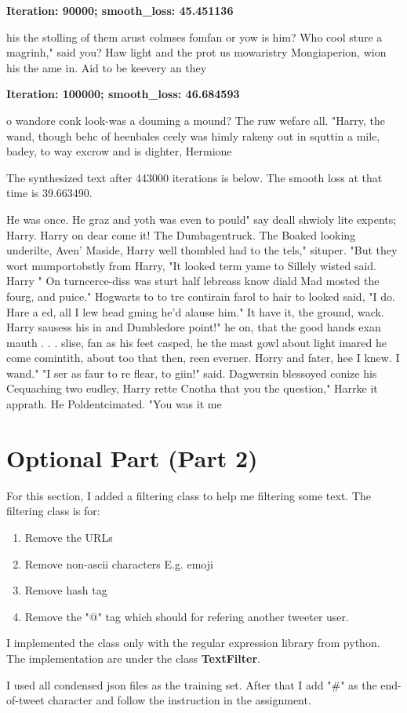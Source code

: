 \documentclass[12pt]{article}
\newenvironment{question}[2][Question]{\begin{trivlist}
\kern10pt
\item[\hskip \labelsep {\bfseries #1}\hskip \labelsep {\bfseries #2.}]}{\end{trivlist}}
\begin{document}
\begin{question}{iii}
\textbf{Iteration: 90000; smooth\_loss: 45.451136}

 his the stolling of them arust colmses fomfan or yow is him?  Who cool sture a magrinh," said you?  Haw light and the prot us mowaristry Mongiaperion, wion his the ame in.  Aid to be keevery an they 


\textbf{Iteration: 100000; smooth\_loss: 46.684593} 

o wandore conk look-was a douming a mound?  The ruw wefare all.  "Harry, the wand, though behc of heenbales ceely was himly rakeny out in squttin a mile, badey, to way excrow and is dighter, Hermione 

\end{question}

\begin{question}{iv}
The synthesized text after 443000 iterations is below. The smooth loss at that time is 39.663490.

He was once.  He graz and yoth was even to pould"  say deall shwioly lite expents; Harry. Harry on dear come it!  The Dumbagentruck.  The Boaked looking underilte, Aven' Maside, Harry well thombled had to the tels," situper.
"But they wort mumportobstly from Harry, "It looked term yame to Sillely wisted said.  Harry "
On turncerce-diss was sturt half lebreass know diald Mad mosted the fourg, and puice."
Hogwarts to to tre contirain farol to hair to looked said, "I do. Hare a ed, all I lew head gming he'd alause him."
It have it, the ground, wack.  Harry sausess his in and Dumbledore point!"  he on, that the good hands exan mauth . . . slise, fan as his feet casped, he the mast gowl about light imared he come comintith, about too that then, reen everner.  Horry and fater, hee I knew.  I wand."
"I ser as faur to re flear, to giin!" said.
Dagwersin blessoyed conize his Cequaching two eudley,
Harry rette Cnotha that you the question,"
Harrke it apprath.  He Poldentcimated.
"You was it me

\end{question}

\section{Optional Part (Part 2)}

For this section, I added a filtering class to help me filtering some text.
The filtering class is for:

\begin{enumerate}
    \item  Remove the URLs
    \item  Remove non-ascii characters E.g. emoji
    \item  Remove hash tag
    \item  Remove the "@" tag which should for refering another tweeter user.
\end{enumerate}

I implemented the class only with the regular expression library from python.
The implementation are under the class \textbf{TextFilter}.

I used all condensed json files as the training set.
After that I add "\#" as the end-of-tweet character and follow the instruction
in the assignment.
\end{document}
